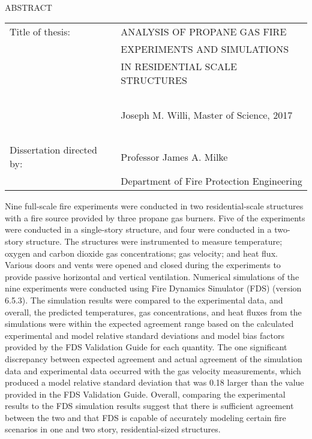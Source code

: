 
\hbox{\ }

\renewcommand{\baselinestretch}{1}
\small \normalsize

\begin{center}
\large{{ABSTRACT}} 

\vspace{3em} 

\end{center}
\hspace{-.15in}
\begin{tabular}{ll}
Title of thesis:		& {\large  ANALYSIS OF PROPANE GAS FIRE}	\\
							& {\large  EXPERIMENTS AND SIMULATIONS} 	\\
							& {\large  IN RESIDENTIAL SCALE STRUCTURES} \\
\ \\
							& {\large  Joseph M. Willi, Master of Science, 2017} \\
\ \\
Dissertation directed by: 	& {\large  Professor James A. Milke} \\
							& {\large  Department of Fire Protection Engineering} \\
\end{tabular}

\vspace{3em}

\renewcommand{\baselinestretch}{2}
\large \normalsize

Nine full-scale fire experiments were conducted in two residential-scale structures with a fire source provided by three propane gas burners. Five of the experiments were conducted in a single-story structure, and four were conducted in a two-story structure. The structures were instrumented to measure temperature; oxygen and carbon dioxide gas concentrations; gas velocity; and heat flux. Various doors and vents were opened and closed during the experiments to provide passive horizontal and vertical ventilation. Numerical simulations of the nine experiments were conducted using Fire Dynamics Simulator (FDS) (version 6.5.3). The simulation results were compared to the experimental data, and overall, the predicted temperatures, gas concentrations, and heat fluxes from the simulations were within the expected agreement range based on the calculated experimental and model relative standard deviations and model bias factors provided by the FDS Validation Guide for each quantity. The one significant discrepancy between expected agreement and actual agreement of the simulation data and experimental data occurred with the gas velocity measurements, which produced a model relative standard deviation that was 0.18 larger than the value provided in the FDS Validation Guide. Overall, comparing the experimental results to the FDS simulation results suggest that there is sufficient agreement between the two and that FDS is capable of accurately modeling certain fire scenarios in one and two story, residential-sized structures.


